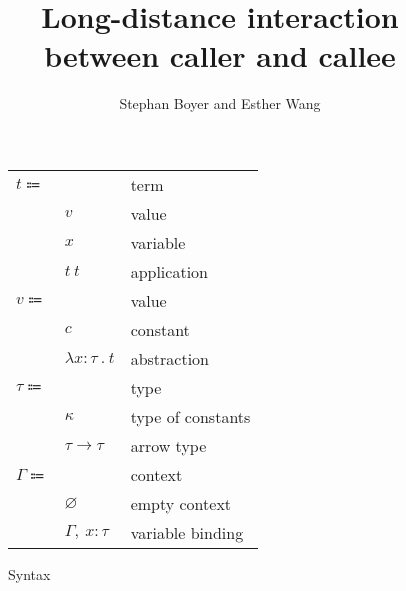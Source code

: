\documentclass[12pt]{article}
\title{Long-distance interaction \\ between caller and callee}
\author{Stephan Boyer and Esther Wang}
\date{}
\newcommand\eterm{t}
\newcommand\evalue{v}
\newcommand\econst{c}
\newcommand\evar{x}
\newcommand\eabs[2]{\lambda #1 \ . \ #2}
\newcommand\eapp[2]{#1 \ #2}
\newcommand\ttype{\tau}
\newcommand\tconst{\kappa}
\newcommand\tarrow[2]{#1 \rightarrow #2}
\newcommand\hastype[2]{#1 : #2}
\newcommand\ccontext{\Gamma}
\newcommand\cempty{\varnothing}
\newcommand\cextend[3]{#1, \ \hastype{#2}{#3}}
\begin{document}
  \maketitle

  \begin{figure}
    \begin{mdframed}
      \begin{center}
        \begin{tabular}{l l l}
          $\eterm \Coloneqq $ & & term \\
          & $\evalue$ & value \\
          & $\evar$ & variable \\
          & $\eapp{\eterm}{\eterm}$ & application \\
          $\evalue \Coloneqq $ & & value \\
          & $\econst$ & constant \\
          & $\eabs{\hastype{\evar}{\ttype}}{\eterm}$ & abstraction \\
          $\ttype \Coloneqq$ & & type \\
          & $\tconst$ & type of constants \\
          & $\tarrow{\ttype}{\ttype}$ & arrow type \\
          $\ccontext \Coloneqq$ & & context \\
          & $\cempty$ & empty context \\
          & $\cextend{\ccontext}{\evar}{\ttype}$ & variable binding \\
        \end{tabular}
      \end{center}

      \caption{Syntax}
      \label{fig:syntax}
    \end{mdframed}
  \end{figure}
\end{document}
